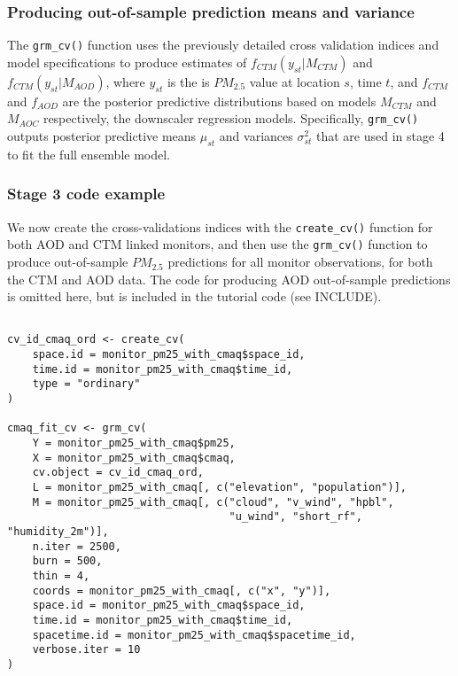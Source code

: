 \documentclass[12pt]{article}
\begin{document}
\subsubsection*{Producing out-of-sample prediction means and variance}

The \texttt{grm\_cv()} function uses the previously detailed cross validation indices and model specifications to produce estimates of $f_{CTM}(y_{st} | M_{CTM})$ and $f_{CTM}(y_{st} | M_{AOD})$, where $y_{st}$ is the is $PM_{2.5}$ value at location $s$, time $t$, and $f_{CTM}$ and $f_{AOD}$ are the posterior predictive distributions based on models $M_{CTM}$ and $M_{AOC}$ respectively, the downscaler regression models. 
Specifically, \texttt{grm\_cv()} outputs posterior predictive means $\mu_{st}$ and variances $\sigma^2_{st}$ that are used in stage 4 to fit the full ensemble model. 


\subsubsection*{Stage 3 code example}

We now create the cross-validations indices with the \texttt{create\_cv()} function for both AOD and CTM linked monitors, and then use the \texttt{grm\_cv()} function to produce out-of-sample $PM_{2.5}$ predictions for all monitor observations, for both the CTM and AOD data.
The code for producing AOD out-of-sample predictions is omitted here, but is included in the tutorial code (see INCLUDE).

\begin{lstlisting}

cv_id_cmaq_ord <- create_cv(
    space.id = monitor_pm25_with_cmaq$space_id,
    time.id = monitor_pm25_with_cmaq$time_id, 
    type = "ordinary"
)

cmaq_fit_cv <- grm_cv(
    Y = monitor_pm25_with_cmaq$pm25,
    X = monitor_pm25_with_cmaq$cmaq,
    cv.object = cv_id_cmaq_ord,
    L = monitor_pm25_with_cmaq[, c("elevation", "population")],
    M = monitor_pm25_with_cmaq[, c("cloud", "v_wind", "hpbl", 
                                   "u_wind", "short_rf", "humidity_2m")],
    n.iter = 2500,
    burn = 500,
    thin = 4,
    coords = monitor_pm25_with_cmaq[, c("x", "y")],
    space.id = monitor_pm25_with_cmaq$space_id,
    time.id = monitor_pm25_with_cmaq$time_id,
    spacetime.id = monitor_pm25_with_cmaq$spacetime_id,
    verbose.iter = 10
)

\end{lstlisting}
\end{document}

